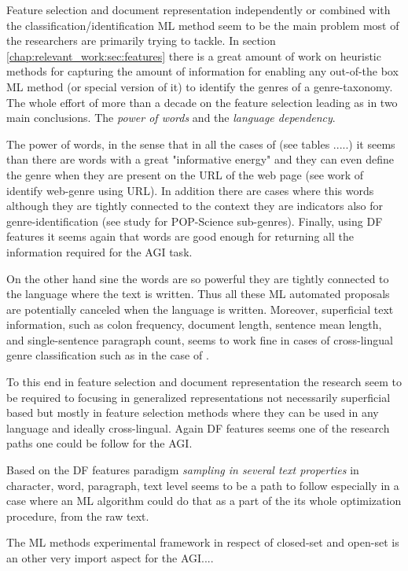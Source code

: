 Feature selection and document representation independently or combined with the classification/identification ML method seem to be the main problem most of the researchers are primarily trying to tackle. In section \ref{chap:relevant_work:sec:features} there is a great amount of work on heuristic methods for capturing the amount of information for enabling any out-of-the box ML method (or special version of it) to identify the genres of a genre-taxonomy. The whole effort of more than a decade on the feature selection leading as in two main conclusions. The \textit{power of words} and the \textit{language dependency}.

The power of words, in the sense that in all the cases of (see tables .....) it seems than there are words with a great "informative energy" and they can even define the genre when they are present on the URL of the web page (see work of identify web-genre using URL). In addition there are cases where this words although they are tightly connected to the context they are indicators also for genre-identification (see study for POP-Science sub-genres). Finally, using DF features it seems again that words are good enough for returning all the information required for the AGI task. 

On the other hand sine the words are so powerful they are tightly connected to the language where the text is written. Thus all these ML automated proposals are potentially canceled when the language is written. Moreover, superficial text information, such as colon frequency, document length, sentence mean length, and single-sentence paragraph count, seems to work fine in cases of cross-lingual genre classification such as in the case of \parencite{nguyen2019cross}. 

To this end in feature selection and document representation the research seem to be  required to focusing in generalized representations not necessarily superficial based but mostly in feature selection methods where they can be used in any language and ideally cross-lingual. Again DF features seems one of the research paths one could be follow for the AGI.

Based on the DF features paradigm \textit{sampling in several text properties} in character, word, paragraph, text level seems to be a path to follow especially in a case where an ML algorithm could do that as a part of the its whole optimization procedure, from the raw text.

The ML methods experimental framework in respect of closed-set and open-set is an other very import aspect for the AGI....

























